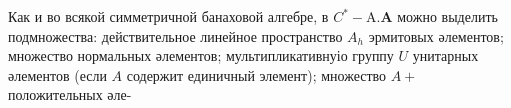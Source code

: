 \documentclass[10pt]{article}
\begin{document}
Как и во всякой симметричной банаховой алгебре, в $C^{*}-\mathrm{A} . \boldsymbol{A}$ можно выделить подмножества: действительное линейное пространство $A_{h}$ эрмитовых әлементов; множество нормальных әлементов; мультипликативнуіо группу $U$ унитарных әлементов (если $A$ содержит единичный элемент); множество $A+$ положительных әле-
\end{document}
